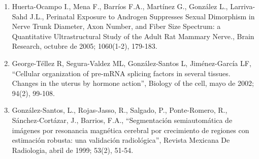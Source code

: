 \begin{enumerate}
\item Huerta-Ocampo I., Mena F., Barríos F.A., Martínez G., González L., Larriva-Sahd J.L., Perinatal Exposure 
to 
Androgen Suppresses Sexual Dimorphism in Nerve Trunk Diameter, Axon Number, and Fiber Size Spectrum: a 
Quantitative Ultrastructural Study of the Adult Rat Mammary Nerve., Brain Research, octubre de 2005; 
1060(1-2), 179-183.

\item George-Téllez R, Segura-Valdez ML, González-Santos L, Jiménez-García LF, “Cellular organization of 
pre-mRNA 
splicing factors in several tissues. Changes in the uterus by hormone action”, Biology of the cell, mayo de 
2002; 94(2), 99-108.

\item González-Santos, L., Rojas-Jasso, R., Salgado, P., Ponte-Romero, R., Sánchez-Cortázar, J., Barrios, 
F.A., 
“Segmentación semiautomática de imágenes por resonancia magnética cerebral por crecimiento de regiones con 
estimación robusta: una validación radiológica”, Revista Mexicana De Radiologia, abril de 1999; 53(2), 51-54.

\end{enumerate}


